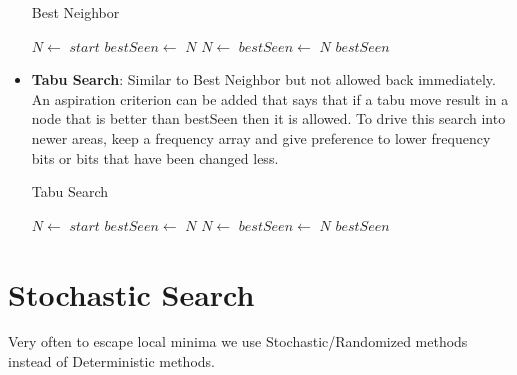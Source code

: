 \documentclass[a4paper]{article}
\begin{document}
\begin{itemize}
    \begin{algorithm}[H]
        \caption{Best Neighbor}\label{alg:best-neighbor}
        \begin{algorithmic}[1]
            \Statex {}
            \State $N\gets$ $start$
            \State $bestSeen\gets$ $N$
                \State $N\gets$ 
                    \State $bestSeen\gets$ $N$
                \EndIf
            \EndWhile
            \State \Return $bestSeen$
        \end{algorithmic}
    \end{algorithm}
    \item \textbf{Tabu Search}: Similar to Best Neighbor but not allowed back immediately. An aspiration criterion can be added that says that if a tabu move result in a node that is better than bestSeen then it is allowed. To drive this search into newer areas, keep a frequency array and give preference to lower frequency bits or bits that have been changed less.
    \begin{algorithm}[H]
        \caption{Tabu Search}\label{alg:tabu-search}
        \begin{algorithmic}[1]
            \Statex {}
            \State $N\gets$ $start$
            \State $bestSeen\gets$ $N$
                \State $N\gets$ 
                    \State $bestSeen\gets$ $N$
                \EndIf
            \EndWhile
            \State \Return $bestSeen$
        \end{algorithmic}
    \end{algorithm}
\end{itemize}

\section{Stochastic Search}
Very often to escape local minima we use Stochastic/Randomized methods instead of Deterministic methods.
\end{document}
